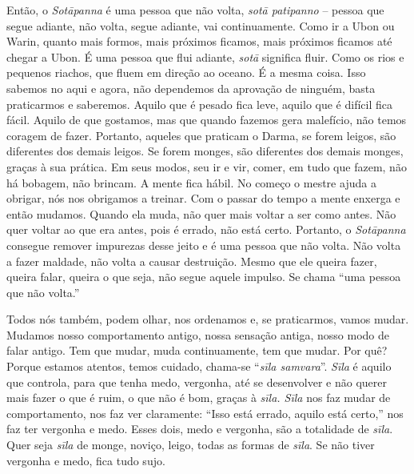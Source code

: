 Então, o \textit{Sotāpanna} é uma pessoa que não volta,
\textit{sotā patipanno} – pessoa que segue adiante, não volta, segue
adiante, vai continuamente. Como ir a Ubon ou Warin, quanto mais
formos, mais próximos ficamos, mais próximos ficamos até chegar a Ubon.
É uma pessoa que flui adiante, \textit{sotā} significa fluir. Como os
rios e pequenos riachos, que fluem em direção ao oceano. É a mesma
coisa. Isso sabemos no aqui e agora, não dependemos da aprovação de
ninguém, basta praticarmos e saberemos. Aquilo que é pesado fica leve,
aquilo que é difícil fica fácil. Aquilo de que gostamos, mas que quando
fazemos gera malefício, não temos coragem de fazer. Portanto, aqueles
que praticam o Darma, se forem leigos, são diferentes dos demais
leigos. Se forem monges, são diferentes dos demais monges, graças à sua
prática. Em seus modos, seu ir e vir, comer, em tudo que fazem, não há
bobagem, não brincam. A mente fica hábil. No começo o mestre ajuda a
obrigar, nós nos obrigamos a treinar. Com o passar do tempo a mente
enxerga e então mudamos. Quando ela muda, não quer mais voltar a ser
como antes. Não quer voltar ao que era antes, pois é errado, não está
certo. Portanto, o \textit{Sotāpanna} consegue remover impurezas
desse jeito e é uma pessoa que não volta. Não volta a fazer maldade,
não volta a causar destruição. Mesmo que ele queira fazer, queira
falar, queira o que seja, não segue aquele impulso. Se chama “uma
pessoa que não volta.” 

Todos nós também, podem olhar, nos ordenamos e, se praticarmos,
vamos mudar. Mudamos nosso comportamento antigo, nossa sensação antiga,
nosso modo de falar antigo. Tem que mudar, muda continuamente, tem que
mudar. Por quê? Porque estamos atentos, temos cuidado, chama-se
“\textit{sīla samvara}”. \textit{Sīla} é aquilo que controla,
para que tenha medo, vergonha, até se desenvolver e não querer mais
fazer o que é ruim, o que não é bom, graças à \textit{sīla. Sīla}
nos faz mudar de comportamento, nos faz ver claramente: “Isso está
errado, aquilo está certo,” nos faz ter vergonha e medo. Esses dois,
medo e vergonha, são a totalidade de \textit{sīla}. Quer seja
\textit{sīla} de monge, noviço, leigo, todas as formas de
\textit{sīla}. Se não tiver vergonha e medo, fica tudo sujo. 

